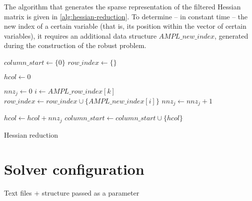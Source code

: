 \documentclass[11pt,twoside]{book}
\begin{document}
The algorithm that generates the sparse representation of the filtered Hessian matrix is given in
\autoref{alg:hessian-reduction}. To determine -- in constant time -- the new index of a certain variable (that is, its
position within the vector of certain variables), it requires an additional data structure $\mathit{AMPL\_new\_index}$,
generated during the construction of the robust problem.

\begin{algorithm}[htbp]
$\mathit{column\_start} \gets \{0\}$ \;
$\mathit{row\_index} \gets \{\}$ \;

$\mathit{hcol} \gets 0$ \;

 {
	$\mathit{nnz}_j \gets 0$ \;
	 {
		 {
			$i \gets \mathit{AMPL\_row\_index}[k]$ \;
			 {
				$\mathit{row\_index} \gets \mathit{row\_index} \cup \{\mathit{AMPL\_new\_index}[i]\}$ \;
				$\mathit{nnz}_j \gets \mathit{nnz}_j + 1$ \;
			}
		}
	}
	
	$\mathit{hcol} \gets \mathit{hcol} + \mathit{nnz}_j$ \;
	$\mathit{column\_start} \gets \mathit{column\_start} \cup \{\mathit{hcol}\}$ \;
}
\caption{Hessian reduction}
\label{alg:hessian-reduction}
\end{algorithm}

\chapter{Solver configuration}

Text files + structure passed as a parameter



\end{document}
